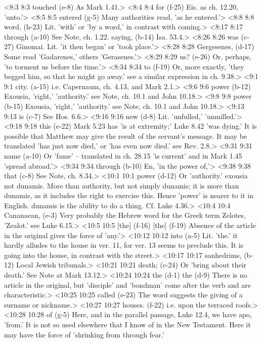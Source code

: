 <8:3 8:3  touched (e-8)  As Mark 1.41.>
<8:4 8:4  for (f-25)  Eis. as ch. 12.20, 'unto.'>
<8:5 8:5  entered (g-5)  Many authorities read, 'as he entered.'>
<8:8 8:8  word, (h-23)  Lit. 'with' or 'by a word,' in contrast with coming.>
<8:17 8:17  through (a-10)  See Note, ch. 1.22.
  saying, (b-14)  Isa. 53.4.>
<8:26 8:26  was (c-27)  Ginomai. Lit. 'it then began' or 'took place.'>
<8:28 8:28  Gergesenes, (d-17)  Some read 'Gadarenes,' others 'Gerasenes.'>
<8:29 8:29  us? (e-26)  Or, perhaps, 'to torment us before the time.'>
<8:34 8:34  to (f-19)  Or, more exactly, 'they begged him, so that he might go  away.' see a similar expression in ch. 9.38.>
<9:1 9:1  city. (a-15)  i.e. Capernaum, ch. 4.13, and Mark 2.1.>
<9:6 9:6  power (b-12)  Exousia, 'right,' 'authority.' see Note, ch. 10.1 and John  10.18.>
<9:8 9:8  power (b-15)  Exousia, 'right,' 'authority.' see Note, ch. 10.1 and John  10.18.>
<9:13 9:13  is (c-7)  See Hos. 6.6.>
<9:16 9:16  new (d-8)  Lit. 'unfulled,' 'unmilled.'>
<9:18 9:18  this (e-22)  Mark 5.23 has 'is at extremity;' Luke 8.42 'was dying.' It is  possible that Matthew may give the result of the servant's  message. It may be translated 'has just now died,' or 'has even  now died.' see Rev. 2.8.>
<9:31 9:31  name (a-10)  Or 'fame' -- translated in ch. 28.15 'is current' and in Mark  1.45 'spread abroad.'>
<9:34 9:34  through (b-10)  En, 'in the power of,'>
<9:38 9:38  that (c-8)  See Note, ch. 8.34.>
<10:1 10:1  power (d-12)  Or 'authority.' exousia not dunamis. More than authority,  but not simply dunamis; it is more than dunamis, as it  includes the right to exercise this. Hence 'power' is nearer to  it in English. dunamis is the ability to do a thing. Cf. Luke  4.36.>
<10:4 10:4  Cananaean, (e-3)  Very probably the Hebrew word for the Greek term Zelotes,  'Zealot.' see Luke 6.15.>
<10:5 10:5  [the] (f-16)  [the] (f-19)
  Absence of the article in the original gives the force of  'any.'>
<10:12 10:12  into (a-5)  Lit. 'the.' it hardly alludes to the house in ver. 11, for  ver. 13 seems to preclude this. It is going into the house, in  contrast with the street.>
<10:17 10:17  sanhedrims, (b-12)  Local Jewish tribunals.>
<10:21 10:21  death; (c-24)  Or 'bring about their death.' See Note at Mark 13.12.>
<10:24 10:24  the (d-1)  the (d-9)
  There is no article in the original, but 'disciple' and  'bondman' come after the verb and are characteristic.>
<10:25 10:25  called (e-23)  The word suggests the giving of a surname or nickname.>
<10:27 10:27  houses. (f-22)  i.e. upon the terraced roofs.>
<10:28 10:28  of (g-5)  Here, and in the parallel passage, Luke 12.4, we have apo,  'from.' It is not so used elsewhere that I know of in the New  Testament. Here it may have the force of 'shrinking from  through fear.'
